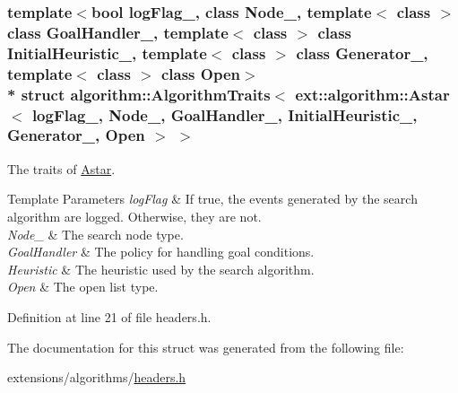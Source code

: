 \subsubsection*{template$<$bool log\+Flag\+\_\+, class Node\+\_\+, template$<$ class $>$ class Goal\+Handler\+\_\+, template$<$ class $>$ class Initial\+Heuristic\+\_\+, template$<$ class $>$ class Generator\+\_\+, template$<$ class $>$ class Open$>$\\*
struct algorithm\+::\+Algorithm\+Traits$<$ ext\+::algorithm\+::\+Astar$<$ log\+Flag\+\_\+, Node\+\_\+, Goal\+Handler\+\_\+, Initial\+Heuristic\+\_\+, Generator\+\_\+, Open $>$ $>$}

The traits of \hyperlink{structAstar}{Astar}. 


\begin{DoxyTemplParams}{Template Parameters}
{\em log\+Flag} & If {\ttfamily true}, the events generated by the search algorithm are logged. Otherwise, they are not. \\
\hline
{\em Node\+\_\+} & The search node type. \\
\hline
{\em Goal\+Handler} & The policy for handling goal conditions. \\
\hline
{\em Heuristic} & The heuristic used by the search algorithm. \\
\hline
{\em Open} & The open list type. \\
\hline
\end{DoxyTemplParams}


Definition at line 21 of file headers.\+h.



The documentation for this struct was generated from the following file\+:\begin{DoxyCompactItemize}
\item 
extensions/algorithms/\hyperlink{extensions_2algorithms_2headers_8h}{headers.\+h}\end{DoxyCompactItemize}
